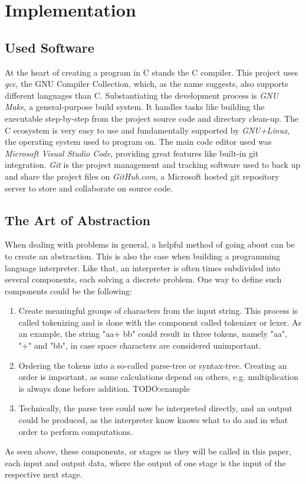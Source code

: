 \documentclass[12pt,a4paper,man]{apa7}
\begin{document}
\section{Implementation}
\subsection{Used Software}
At the heart of creating a program in C stands the C compiler. This project uses
\emph{gcc}, the GNU Compiler Collection, which, as the name suggests, also 
supports different languages than C. Substantiating the development process is 
\emph{GNU Make}, a general-purpose build system. It handles tasks like building
the executable step-by-step from the project source code and directory clean-up.
The C ecosystem is very easy to use and fundamentally supported by 
\emph{GNU+Linux}, the operating system used to program on.
The main code editor used was \emph{Microsoft Visual Studio Code}, providing great
features like built-in git integration.
\emph{Git} is the project management and tracking software used to back up and share
the project files on \emph{GitHub.com}, a Microsoft hosted git repository server to
store and collaborate on source code.

\subsection{The Art of Abstraction}
When dealing with problems in general, a helpful method of going about can be
to create an abstraction. This is also the case when building a programming
language interpreter. Like that, an interpreter is often times subdivided into several
components, each solving a discrete problem. One way to define
such components could be the following:
\begin{enumerate}\label{simple interpreter}
    \item Create meaningful groups of characters from the input string. This
        process is called tokenizing and is done with the component called
        tokenizer or lexer. As an example, the string "aa+  bb" could result
        in three tokens, namely "aa", "+" and "bb", in case space characters
        are considered unimportant.
    \item Ordering the tokens into a so-called parse-tree or syntax-tree.
        Creating an order is important, as some calculations depend on others, e.g. multiplication
        is always done before addition. TODO:example
    \item Technically, the parse tree could now be interpreted directly, and
        an output could be produced, as the interpreter know knows what to do
        and in what order to perform computations.
\end{enumerate}
As seen above, these components, or stages as they will be called in this paper,
each input and output data, where the output of one stage is the input of the
respective next stage.
\end{document}
